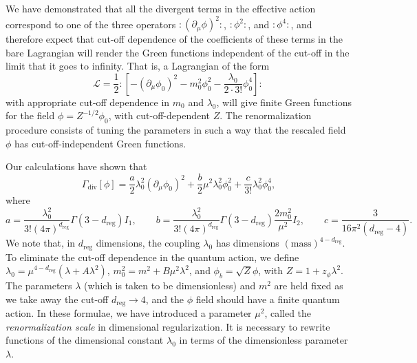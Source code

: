 
We have demonstrated that all the divergent terms in the effective action
correspond to one of the three operators $:(\partial_\mu\phi)^2:$, $:\phi^2:$,
and $:\phi^4:$, and therefore expect that cut-off dependence of the coefficients
of these terms in the bare Lagrangian will render the Green functions independent
of the cut-off in the limit that it goes to infinity. That is, a Lagrangian of the
form
\[
  \mathcal{L}=\frac{1}{2}:\!\left[-(\partial_\mu\phi_0)^2-m_0^2\phi_0^2
  -\frac{\lambda_0}{2\cdot3!}\phi_0^4\right]\!:\,
\]
with appropriate cut-off dependence in $m_0$ and $\lambda_0$, will give finite
Green functions for the field $\phi=Z^{-1/2}\phi_0$, with cut-off-dependent $Z$.
The renormalization procedure consists of tuning the parameters in such a way
that the rescaled field $\phi$ has cut-off-independent Green functions.

Our calculations have shown that
\[
  \Gamma_{\mathrm{div}}[\phi]
  =\frac{a}{2}\lambda_0^2(\partial_\mu\phi_0)^2
  +\frac{b}{2}\mu^2\lambda_0^2\phi_0^2
  +\frac{c}{3!}\lambda_0^2\phi_0^4,
\]
where
\[
  a=\frac{\lambda_0^2}{3!(4\pi)^{d_{\mathrm{reg}}}}
  \Gamma(3-d_{\mathrm{reg}})I_1,
  \qquad
  b=\frac{\lambda_0^2}{3!(4\pi)^{d_{\mathrm{reg}}}}
  \Gamma(3-d_{\mathrm{reg}})\frac{2m_0^2}{\mu^2}I_2,
  \qquad
  c=\frac{3}{16\pi^2(d_{\mathrm{reg}}-4)}.
\]
We note that, in $d_{\mathrm{reg}}$ dimensions, the coupling $\lambda_0$ has dimensions
$(\text{mass})^{4-d_{\mathrm{reg}}}$. To eliminate the cut-off dependence in the quantum
action, we define $\lambda_0=\mu^{4-d_{\mathrm{reg}}}(\lambda+A\lambda^2)$,
$m_0^2=m^2+B\mu^2\lambda^2$, and $\phi_b=\sqrt{Z}\phi$, with
$Z=1+z_\phi\lambda^2$. The parameters $\lambda$ (which is taken to be dimensionless)
and $m^2$ are held fixed as we take away the cut-off $d_{\mathrm{reg}}\to4$, and the $\phi$ field
should have a finite quantum action. In these formulae, we have introduced a
parameter $\mu^2$, called the \emph{renormalization scale} in dimensional
regularization. It is necessary to rewrite functions of the dimensional constant
$\lambda_0$ in terms of the dimensionless parameter $\lambda$.

